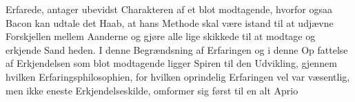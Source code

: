 \documentclass[12pt,a4paper]{book}
\begin{document}
Erfarede, antager ubevidst Charakteren af et blot modtagende,
hvorfor ogsaa Bacon kan udtale det Haab, at hans Methode
skal være istand til at udjævne Forskjellen mellem Aanderne
og gjøre alle lige skikkede til at modtage og erkjende Sand\-%
heden. I denne Begrændsning af Erfaringen og i denne Op\-%
fattelse af Erkjendelsen som blot modtagende ligger Spiren til
den Udvikling, gjennem hvilken Erfaringsphilosophien, for
hvilken oprindelig Erfaringen vel var væsentlig, men ikke
eneste Erkjendelseskilde, omformer sig først til en alt Aprio\-%
%
%
%
\end{document}

